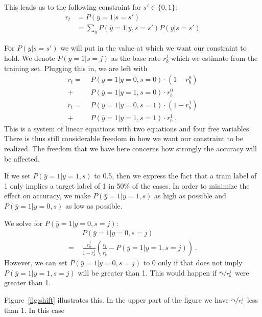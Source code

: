 This leads us to the following constraint for $s\prime\in\{0, 1\}$:
\begin{align}
  r_t &= P(\bar{y}=1|s=s\prime)\nonumber\\
  &= \sum\limits_y P(\bar{y}=1|y,s=s\prime) P(y|s=s\prime)
\end{align}

For $P(y|s=s\prime)$ we will put in the value at which we want our constraint to hold.
We denote $P(y=1|s=j)$ as the base rate $r_b^j$ which we estimate from the training set.
Plugging this in, we are left with
\begin{align}
  r_t = \,\,&P(\bar{y}=1|y=0,s=0) \cdot (1-r_b^0) \nonumber\\
  +\, &P(\bar{y}=1|y=1,s=0) \cdot r_b^0 \\
  r_t = \,\,&P(\bar{y}=1|y=0,s=1) \cdot (1-r_b^1)\nonumber\\
  +\, &P(\bar{y}=1|y=1,s=1) \cdot r_b^1~.
\end{align}
This is a system of linear equations with two equations and four free variables.
There is thus still considerable freedom in how we want our constraint to be realized.
The freedom that we have here concerns how strongly the accuracy will be affected.

If we set $P(\bar{y}=1|y=1,s)$ to 0.5,
then we express the fact that a train label of 1 only implies a target label of 1 in 50\% of the cases.
In order to minimize the effect on accuracy,
we make $P(\bar{y}=1|y=1,s)$ as high as possible and $P(\bar{y}=1|y=0,s)$ as low as possible.

We solve for $P(\bar{y}=1|y=0,s=j)$:
\begin{align}
  &P(\bar{y}=1|y=0,s=j)\nonumber\\
  =\,\, &\frac{r_b^j}{1-r_b^j} \left(\frac{r_t}{r_b^j} - P(\bar{y}=1|y=1,s=j)\right)~.
\end{align}
However, we can set $P(\bar{y}=1|y=0,s=j)$ to 0
only if that does not imply $P(\bar{y}=1|y=1,s=j)$ will be greater than 1.
This would happen if $\nicefrac{r_t}{r_b^j}$ were greater than 1.

Figure~\ref{fig:shift} illustrates this.
In the upper part of the figure we have $\nicefrac{r_t}{r_b^j}$ less than 1.
In this case



